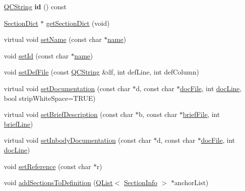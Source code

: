 \begin{DoxyCompactItemize}
\mbox{\hyperlink{class_q_c_string}{Q\+C\+String}} {\bfseries id} () const
\item 
\mbox{\hyperlink{class_section_dict}{Section\+Dict}} $\ast$ \mbox{\hyperlink{class_definition_a6e1082b554fd3077ad96455c7bacf20e}{get\+Section\+Dict}} (void)
\item 
virtual void \mbox{\hyperlink{class_definition_aaa3c1632bd89cb3db7c7713df4e36db0}{set\+Name}} (const char $\ast$\mbox{\hyperlink{class_definition_a9324000f785d7b6b098878a3bca4df5b}{name}})
\item 
void \mbox{\hyperlink{class_definition_ae653664eee43cfe5992cd91377f8e91b}{set\+Id}} (const char $\ast$\mbox{\hyperlink{class_definition_a9324000f785d7b6b098878a3bca4df5b}{name}})
\item 
void \mbox{\hyperlink{class_definition_a101ae2b46d12bd21492863a593d04d90}{set\+Def\+File}} (const \mbox{\hyperlink{class_q_c_string}{Q\+C\+String}} \&df, int def\+Line, int def\+Column)
\item 
virtual void \mbox{\hyperlink{class_definition_af13e2148f395d2704535e52f50ccc418}{set\+Documentation}} (const char $\ast$d, const char $\ast$\mbox{\hyperlink{class_definition_ab09272aa15b4047f0ab77652172cdd4b}{doc\+File}}, int \mbox{\hyperlink{class_definition_a5ecf2e47a19282fbe1dc3413fd73263f}{doc\+Line}}, bool strip\+White\+Space=T\+R\+UE)
\item 
virtual void \mbox{\hyperlink{class_definition_a5f6f7e25d740acb612b57365f9fccfc2}{set\+Brief\+Description}} (const char $\ast$b, const char $\ast$\mbox{\hyperlink{class_definition_a7517dda8109eca884911ac31b42faf3c}{brief\+File}}, int \mbox{\hyperlink{class_definition_a1f87d37cefff16dc8a300795543a7059}{brief\+Line}})
\item 
virtual void \mbox{\hyperlink{class_definition_a829959b92985d0264b9fc17277bf91b4}{set\+Inbody\+Documentation}} (const char $\ast$d, const char $\ast$\mbox{\hyperlink{class_definition_ab09272aa15b4047f0ab77652172cdd4b}{doc\+File}}, int \mbox{\hyperlink{class_definition_a5ecf2e47a19282fbe1dc3413fd73263f}{doc\+Line}})
\item 
void \mbox{\hyperlink{class_definition_a9548c1e2218ce2730c6c3e31bdac6452}{set\+Reference}} (const char $\ast$r)
\item 
void \mbox{\hyperlink{class_definition_a2314524366e46c9d0cd8bcb528d6238d}{add\+Sections\+To\+Definition}} (\mbox{\hyperlink{class_q_list}{Q\+List}}$<$ \mbox{\hyperlink{struct_section_info}{Section\+Info}} $>$ $\ast$anchor\+List)
\item 
\mbox{\label{class_definition_a7c5466b95c0544781c25c93d3ed8a543}} 

\end{DoxyCompactItemize}
